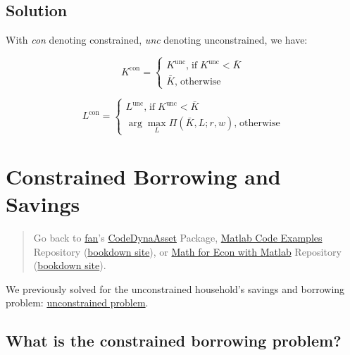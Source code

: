 \documentclass[
]{book}
\begin{document}
\hypertarget{solution}{%
\subsection{Solution}\label{solution}}

With \emph{con} denoting constrained, \emph{unc} denoting unconstrained, we have:

\[K^{\textrm{con}} =\left\lbrace \begin{array}{c}
K^{\textrm{unc}} \textrm{,}\;\textrm{if}\;K^{\textrm{unc}} <\bar{K} \\
\bar{K} \textrm{,}\;\textrm{otherwise}
\end{array}\right.\]

\[L^{\textrm{con}} =\left\lbrace \begin{array}{c}
L^{\textrm{unc}} \textrm{,}\;\textrm{if}\;K^{\textrm{unc}} <\bar{K} \\
\arg \max_L \Pi \left(\bar{K} ,L;r,w\right)\textrm{,}\;\textrm{otherwise}
\end{array}\right.\]

\hypertarget{constrained-borrowing-and-savings}{%
\section{Constrained Borrowing and Savings}\label{constrained-borrowing-and-savings}}

\begin{quote}
Go back to \href{http://fanwangecon.github.io/}{fan}'s \href{https://fanwangecon.github.io/CodeDynaAsset/}{CodeDynaAsset} Package, \href{https://fanwangecon.github.io/M4Econ/}{Matlab Code Examples} Repository (\href{https://fanwangecon.github.io/M4Econ/bookdown}{bookdown site}), or \href{https://fanwangecon.github.io/Math4Econ/}{Math for Econ with Matlab} Repository (\href{https://fanwangecon.github.io/Math4Econ/bookdown}{bookdown site}).
\end{quote}

We previously solved for the unconstrained household's savings and
borrowing problem: \href{https://fanwangecon.github.io/Math4Econ/derivative_application/K_save_households.html}{unconstrained
problem}.

\hypertarget{what-is-the-constrained-borrowing-problem}{%
\subsection{What is the constrained borrowing problem?}\label{what-is-the-constrained-borrowing-problem}}
\end{document}
